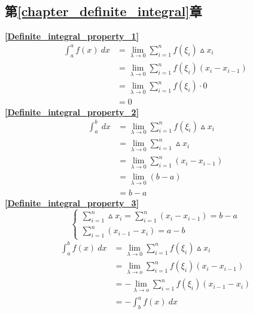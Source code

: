 \subsection{\centering 第\ref{chapter_definite_integral}章}
\textbf{\large \ref{Definite_integral_property_1}}
\begin{align*}
	\int_{a}^{a}f(x)\ dx&=\lim\limits_{{\lambda}\to{0}}\sum_{i=1}^{n}f(\xi_i)\vartriangle x_i\\
	&=\lim\limits_{{\lambda}\to{0}}\sum_{i=1}^{n}f(\xi_i)(x_i-x_{i-1})\\
	&=\lim\limits_{{\lambda}\to{0}}\sum_{i=1}^{n}f(\xi_i)\cdot 0\\
	&=0
\end{align*}
\textbf{\large \ref{Definite_integral_property_2}}
\begin{align*}
	\int_{a}^{b}\ dx&=\lim\limits_{{\lambda}\to{0}}\sum_{i=1}^{n}f(\xi_i)\vartriangle x_i\\
	&=\lim\limits_{{\lambda}\to{0}}\sum_{i=1}^{n}\vartriangle x_i\\
	&=\lim\limits_{{\lambda}\to{0}}\sum_{i=1}^{n}(x_i-x_{i-1})\\
	&=\lim\limits_{{\lambda}\to{0}}(b-a)\\
	&=b-a
\end{align*}
\textbf{\large \ref{Definite_integral_property_3}}
$$	\begin{cases}
	\sum_{i=1}^{n}\vartriangle x_i=\sum_{i=1}^{n}(x_i-x_{i-1})=b-a\\
	\sum_{i=1}^{n}(x_{i-1}-x_i)=a-b
\end{cases}$$	
\begin{align*}
	\int_{a}^{b}f(x)\ dx&=\lim\limits_{{\lambda}\to{0}}\sum_{i=1}^{n}f(\xi_i)\vartriangle x_i\\
	&=\lim\limits_{{\lambda}\to{o}}\sum_{i=1}^{n}f(\xi_i)(x_i-x_{i-1})\\
	&=-\lim\limits_{{\lambda}\to{o}}\sum_{i=1}^{n}f(\xi_i)(x_{i-1}-x_i)\\
	&=-\int_{b}^{a}f(x)\ dx
\end{align*}

